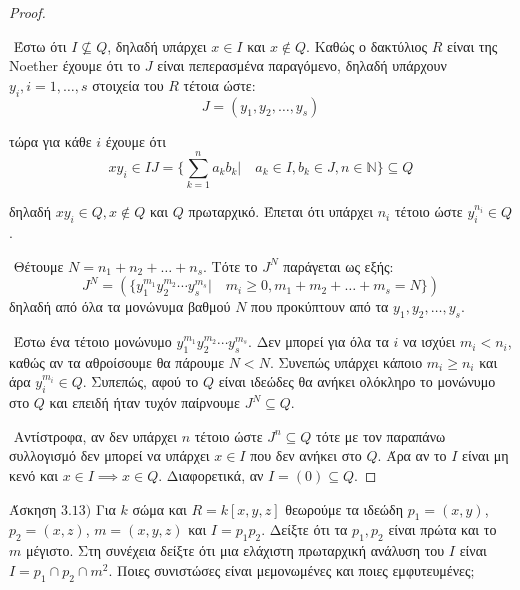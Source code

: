 \documentclass[oneside,a4paper]{article}
\newcommand {\tl}{\textlatin}
\begin{document}
\begin{proof} $ $

	$ $\newline
	Έστω ότι $I \not\subseteq Q$, δηλαδή υπάρχει $x \in I$ και $x \not\in Q$. Καθώς ο δακτύλιος $R$ είναι της \tl{Noether} έχουμε ότι το $J$ είναι πεπερασμένα παραγόμενο, δηλαδή υπάρχουν $y_i, i=1,\ldots,s$ στοιχεία του $R$ τέτοια ώστε:
	$$J = (y_1, y_2 ,\ldots ,y_s)$$

	τώρα για κάθε $i$ έχουμε ότι
	$$xy_i \in IJ = \big\{\sum\limits_{k=1}^n a_k b_k | \quad a_k \in I, b_k \in J, n \in \mathbb{N} \big\} \subseteq Q$$

	δηλαδή $xy_i \in Q, x\not\in Q$ και $Q$ πρωταρχικό. Έπεται ότι υπάρχει $n_i$ τέτοιο ώστε $y_i^{n_i} \in Q$.

	$ $\newline
	Θέτουμε $N = n_1 + n_2 + \ldots + n_s$. Τότε το $J^N$ παράγεται ως εξής:
	$$J^N = \left( \big\{ y^{m_1}_1 y^{m_2}_2 \cdots y ^{m_s}_s | \quad m_i \geq 0, m_1 + m_2 + \ldots + m_s = N \big\}\right)$$
	δηλαδή από όλα τα μονώνυμα βαθμού $N$ που προκύπτουν από τα $y_1, y_2 ,\ldots, y_s$.

	$ $\newline
	Έστω ένα τέτοιο μονώνυμο $y^{m_1}_1 y^{m_2}_2 \cdots y ^{m_s}_s$. Δεν μπορεί για όλα τα $i$ να ισχύει $m_i < n_i$, καθώς αν τα αθροίσουμε θα πάρουμε $N < N$. Συνεπώς υπάρχει κάποιο $m_i \geq n_i$ και άρα $y^{m_i}_i \in Q$. Συπεπώς, αφού το $Q$ είναι ιδεώδες θα ανήκει ολόκληρο το μονώνυμο στο $Q$ και επειδή ήταν τυχόν παίρνουμε $J^N \subseteq Q$.

	$ $\newline
	Αντίστροφα, αν δεν υπάρχει $n$ τέτοιο ώστε $J^n \subseteq Q$ τότε με τον παραπάνω συλλογισμό δεν μπορεί να υπάρχει $x \in I$ που δεν ανήκει στο $Q$. Άρα αν το $I$ είναι μη κενό και $x \in I \implies x \in Q$. Διαφορετικά, αν $I = (0) \subseteq Q$.
\end{proof}

\pagebreak




\noindent Άσκηση $3.13)$
\quad Για $k$ σώμα και $R = k[x,y,z]$ θεωρούμε τα ιδεώδη $p_1 = (x,y)$, $p_2 = (x,z)$, $m = (x,y,z)$ και $I = p_1 p_2$. Δείξτε ότι τα $p_1, p_2$ είναι πρώτα και το $m$ μέγιστο. Στη συνέχεια δείξτε ότι μια ελάχιστη πρωταρχική ανάλυση του $I$ είναι $I=p_1 \cap p_2 \cap m^2$. Ποιες συνιστώσες είναι μεμονωμένες και ποιες εμφυτευμένες;
\end{document}
